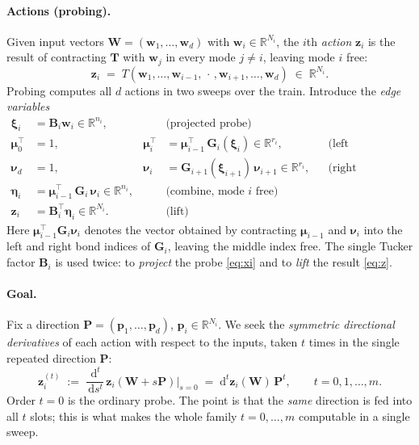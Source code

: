 \documentclass[11pt]{article}
\newcommand{\R}{\mathbb{R}}
\newcommand{\dd}[1]{\,\mathrm{d}#1}
\theoremstyle{definition}
\theoremstyle{plain}
\begin{document}
\paragraph{Actions (probing).}
Given input vectors $\mathbf W = (\mathbf w_1, \dots, \mathbf w_d)$ with $\mathbf w_i \in \R^{N_i}$,
the $i$th \emph{action} $\mathbf z_i$ is the result of contracting $\mathbf T$ with $\mathbf w_j$ in
every mode $j \ne i$, leaving mode $i$ free:
\[
  \mathbf z_i \;=\; T(\mathbf w_1, \dots, \mathbf w_{i-1}, \,\cdot\,, \mathbf w_{i+1}, \dots, \mathbf w_d)
  \;\in\; \R^{N_i}.
\]
Probing computes all $d$ actions in two sweeps over the train. Introduce the \emph{edge variables}
\begin{align}
  \boldsymbol\xi_i      &= \mathbf B_i \mathbf w_i \in \R^{n_i},
  & &\text{(projected probe)} \label{eq:xi}\\
  \boldsymbol\mu_0^\top  &= 1, &
  \boldsymbol\mu_i^\top &= \boldsymbol\mu_{i-1}^\top\, \mathbf G_i(\boldsymbol\xi_i) \in \R^{r_i},
  & &\text{(left pushthrough)} \label{eq:mu}\\
  \boldsymbol\nu_d      &= 1, &
  \boldsymbol\nu_i      &= \mathbf G_{i+1}(\boldsymbol\xi_{i+1})\, \boldsymbol\nu_{i+1} \in \R^{r_i},
  & &\text{(right pushthrough)} \label{eq:nu}\\
  \boldsymbol\eta_i     &= \boldsymbol\mu_{i-1}^\top\, \mathbf G_i\, \boldsymbol\nu_i \in \R^{n_i},
  & &\text{(combine, mode $i$ free)} \label{eq:eta}\\
  \mathbf z_i           &= \mathbf B_i^\top \boldsymbol\eta_i \in \R^{N_i}.
  & &\text{(lift)} \label{eq:z}
\end{align}
Here $\boldsymbol\mu_{i-1}^\top \mathbf G_i \boldsymbol\nu_i$ denotes the vector obtained by
contracting $\boldsymbol\mu_{i-1}$ and $\boldsymbol\nu_i$ into the left and right bond indices of
$\mathbf G_i$, leaving the middle index free. The single Tucker factor $\mathbf B_i$ is used twice:
to \emph{project} the probe \eqref{eq:xi} and to \emph{lift} the result \eqref{eq:z}.

\paragraph{Goal.}
Fix a direction $\mathbf P = (\mathbf p_1, \dots, \mathbf p_d)$, $\mathbf p_i \in \R^{N_i}$. We seek
the \emph{symmetric directional derivatives} of each action with respect to the inputs, taken $t$
times in the single repeated direction $\mathbf P$:
\begin{equation}
  \label{eq:goal}
  \mathbf z_i^{(t)} \;:=\; \frac{\dd{^t}}{\dd s^t}\, \mathbf z_i(\mathbf W + s\mathbf P)\Big|_{s=0}
  \;=\; \mathrm d^t \mathbf z_i(\mathbf W)\,\mathbf P^{t},
  \qquad t = 0, 1, \dots, m.
\end{equation}
Order $t=0$ is the ordinary probe. The point is that the \emph{same} direction is fed into all $t$
slots; this is what makes the whole family $t=0,\dots,m$ computable in a single sweep.
\end{document}
